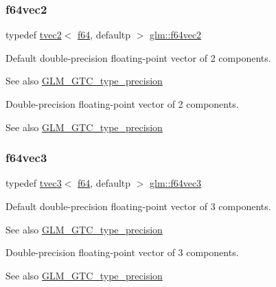 \subsubsection{\texorpdfstring{f64vec2}{f64vec2}}
{\footnotesize\ttfamily typedef \hyperlink{structglm_1_1tvec2}{tvec2}$<$ \hyperlink{group__gtc__type__precision_ga2bba392e555124b36cde6abba349bab3}{f64}, defaultp $>$ \hyperlink{group__gtc__type__precision_gacde4fe7b129521888cd30672c34650c5}{glm\+::f64vec2}}

Default double-\/precision floating-\/point vector of 2 components. \begin{DoxySeeAlso}{See also}
\hyperlink{group__gtc__type__precision}{G\+L\+M\+\_\+\+G\+T\+C\+\_\+type\+\_\+precision}
\end{DoxySeeAlso}
Double-\/precision floating-\/point vector of 2 components. \begin{DoxySeeAlso}{See also}
\hyperlink{group__gtc__type__precision}{G\+L\+M\+\_\+\+G\+T\+C\+\_\+type\+\_\+precision} 
\end{DoxySeeAlso}
\mbox{\label{group__gtc__type__precision_gac531875c6544b7919f36a86cbe538736}} 
\subsubsection{\texorpdfstring{f64vec3}{f64vec3}}
{\footnotesize\ttfamily typedef \hyperlink{structglm_1_1tvec3}{tvec3}$<$ \hyperlink{group__gtc__type__precision_ga2bba392e555124b36cde6abba349bab3}{f64}, defaultp $>$ \hyperlink{group__gtc__type__precision_gac531875c6544b7919f36a86cbe538736}{glm\+::f64vec3}}

Default double-\/precision floating-\/point vector of 3 components. \begin{DoxySeeAlso}{See also}
\hyperlink{group__gtc__type__precision}{G\+L\+M\+\_\+\+G\+T\+C\+\_\+type\+\_\+precision}
\end{DoxySeeAlso}
Double-\/precision floating-\/point vector of 3 components. \begin{DoxySeeAlso}{See also}
\hyperlink{group__gtc__type__precision}{G\+L\+M\+\_\+\+G\+T\+C\+\_\+type\+\_\+precision} 
\end{DoxySeeAlso}
\mbox{\label{group__gtc__type__precision_ga9d896f484039b22873e7bfb9e06f7b47}} 
